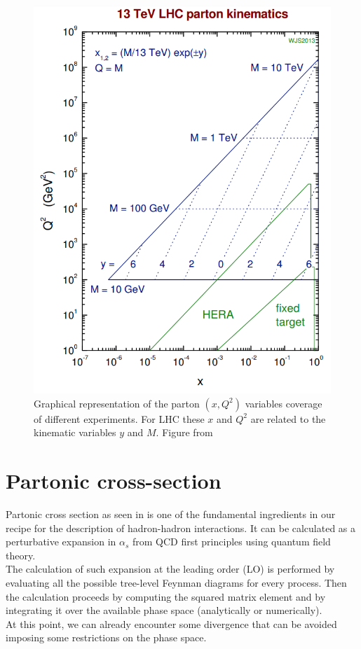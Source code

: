 \begin{figure}[!htb]
	\centering 	
	\includegraphics[width=12cm]{img/xQ2planeCoverage.png}
	\caption{Graphical representation of the parton $(x,Q^2)$ variables coverage of different experiments. For LHC these $x$ and $Q^2$ are related to the kinematic variables $y$ and $M$. Figure from \cite{StirlingPrivate}}
		\label{figure:xQ2planeCoverage}
\end{figure}

\section{Partonic cross-section}

Partonic cross section as seen in  is one of the fundamental ingredients in our recipe for the description of hadron-hadron interactions. It can be calculated as a perturbative expansion in $\alpha_s$ from QCD first principles using quantum field theory.
\\
The calculation of such expansion at the leading order (LO) is performed by evaluating all the possible tree-level Feynman diagrams for every process. Then the calculation proceeds by computing the squared matrix element and by integrating it over the available phase space (analytically or numerically).
\\
At this point, we can already encounter some divergence that can be avoided imposing some  restrictions on the phase space.

